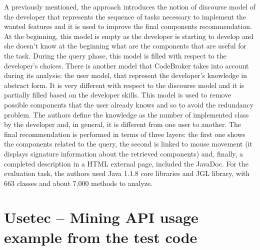 A previously mentioned, the approach introduces the notion of discourse model 
of the developer that represents the sequence of tasks necessary to implement 
the wanted features and it is used to improve the final components 
recommendation. At the beginning, this model is empty as the developer is 
starting to develop and she doesn't know at the beginning what are the 
components that are useful for the task. During the query phase, this model is 
filled with respect to the developer's choices. There is another model that 
CodeBroker takes into account during its analysis: the user model, that 
represent the developer's knowledge in abstract form. It is very different with 
respect to the discourse model and it is partially filled based on the 
developer skills. This model is used to remove possible components that the 
user already knows and so to avoid the redundancy problem. The authors define 
the knowledge as the number of implemented class by the developer and, in 
general, it is different from one user to another. The final recommendation is 
performed in terms of three layers: the first one shows the components related 
to the query, the second is linked to mouse movement (it displays signature 
information about the retrieved components) and, finally, a completed 
description in a HTML external page, included the JavaDoc. For the evaluation 
task, the authors used Java 1.1.8 core libraries and JGL library, with 663 
classes and about 7,000 methods to analyze. 

\section{Usetec -- Mining API usage example from the test code}


